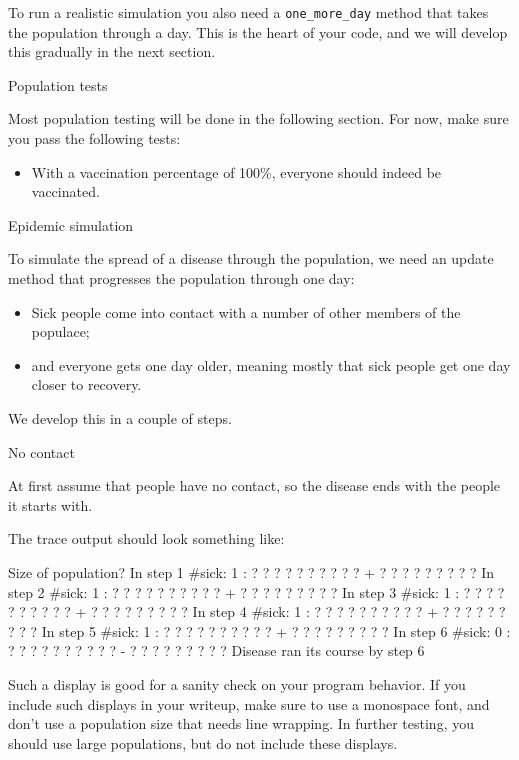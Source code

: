 To run a realistic simulation
you also need a \lstinline{one_more_day} method
that takes the population through a day. 
This is the heart of your code, and we will develop this
gradually in the next section.

 {Population tests}

Most population testing will be done in the following section.
For now, make sure you pass the following tests:
\begin{itemize}
\item With a vaccination percentage of 100\%, everyone should indeed be vaccinated.
\end{itemize}

 {Epidemic simulation}

To simulate the spread of a disease through the population,
we need an update method that progresses the population through one day:
\begin{itemize}
\item Sick people come into contact with a number of other members of the populace;
\item and everyone gets one day older, meaning mostly that sick people
  get one day closer to recovery.
\end{itemize}

We develop this in a couple of steps.

 {No contact}

At first assume that people have no contact, so the disease ends
with the people it starts with.

The trace output should look something like:
\begin{inplaceverbatim}
Size of
population?
In step   1 #sick:    1 :  ? ? ? ? ? ? ? ? ? ? + ? ? ? ? ? ? ? ? ?
In step   2 #sick:    1 :  ? ? ? ? ? ? ? ? ? ? + ? ? ? ? ? ? ? ? ?
In step   3 #sick:    1 :  ? ? ? ? ? ? ? ? ? ? + ? ? ? ? ? ? ? ? ?
In step   4 #sick:    1 :  ? ? ? ? ? ? ? ? ? ? + ? ? ? ? ? ? ? ? ?
In step   5 #sick:    1 :  ? ? ? ? ? ? ? ? ? ? + ? ? ? ? ? ? ? ? ?
In step   6 #sick:    0 :  ? ? ? ? ? ? ? ? ? ? - ? ? ? ? ? ? ? ? ?
Disease ran its course by step 6
\end{inplaceverbatim}

\begin{remark}
  Such a display is good for a sanity check on your program behavior.
  If you include such displays
  in your writeup, make sure to use a monospace font, and don't use a population
  size that needs line wrapping. In further testing, you should use large populations,
  but do not include these displays.
\end{remark}

